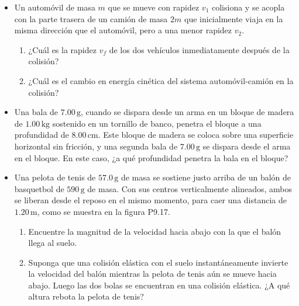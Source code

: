 \documentclass[11pt,a4paper]{article}
\begin{document}
\newpage

\begin{itemize}
    \item[\textbf{15.}] Un automóvil de masa \(m\) que se mueve con rapidez \(v_1\) colisiona y se acopla con la parte trasera de un camión de masa \(2m\) que inicialmente viaja en la misma dirección que el automóvil, pero a una menor rapidez \(v_2\).
    \begin{enumerate}
        \item ¿Cuál es la rapidez \(v_f\) de los dos vehículos inmediatamente después de la colisión?
        \item ¿Cuál es el cambio en energía cinética del sistema automóvil-camión en la colisión?
    \end{enumerate}
    \vspace*{6cm}

    \item[\textbf{16.}] Una bala de \(7.00\,\text{g}\), cuando se dispara desde un arma en un bloque de madera de \(1.00\,\text{kg}\) sostenido en un tornillo de banco, penetra el bloque a una profundidad de \(8.00\,\text{cm}\). Este bloque de madera se coloca sobre una superficie horizontal sin fricción, y una segunda bala de \(7.00\,\text{g}\) se dispara desde el arma en el bloque. En este caso, ¿a qué profundidad penetra la bala en el bloque?
    \vspace*{6cm}

    \item[\textbf{17.}] Una pelota de tenis de \(57.0\,\text{g}\) de masa se sostiene justo arriba de un balón de basquetbol de \(590\,\text{g}\) de masa. Con sus centros verticalmente alineados, ambos se liberan desde el reposo en el mismo momento, para caer una distancia de \(1.20\,\text{m}\), como se muestra en la figura P9.17.
    \begin{enumerate}
        \item Encuentre la magnitud de la velocidad hacia abajo con la que el balón llega al suelo.
        \item Suponga que una colisión elástica con el suelo instantáneamente invierte la velocidad del balón mientras la pelota de tenis aún se mueve hacia abajo. Luego las dos bolas se encuentran en una colisión elástica. ¿A qué altura rebota la pelota de tenis?
    \end{enumerate}
    \vspace*{6cm}
\end{itemize}

\newpage
\end{document}
